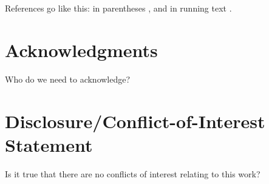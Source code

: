 \documentclass{bioinfo}
\begin{document}
References go like this: in parentheses
\citep{Garyfallidis_thesis,Mori1999}, and in running text
\citet{Garyfallidis_thesis}.

\section*{Acknowledgments}
Who do we need to acknowledge?

\section*{Disclosure/Conflict-of-Interest Statement}
Is it true that there are no conflicts of interest relating to this
work?

%

%
%
%
%

\end{document}
